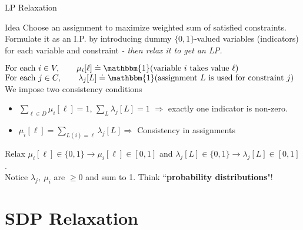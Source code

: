 \documentclass[10pt,t,compress]{beamer}
\begin{document}
\begin{frame}{LP Relaxation}
\begin{block}{Idea}
Choose an assignment to maximize weighted sum of satisfied constraints. \pause Formulate it as an I.P. by introducing dummy $\{ 0, 1\}$-valued variables (indicators) for each variable and constraint \pause \emph{- then relax it to get an LP.}
\end{block} \pause
$\text{For each } i \in V, \qquad  \mu_i[\ell] \doteq \mathbbm{1}( \text{variable $i$ takes value } \ell)$ \\
\vspace{0.25cm}
\pause
$\text{For each } j \in C, \qquad
   \lambda_j[L] \doteq \mathbbm{1}( \text{assignment $L$ is used for constraint $j$})$ \\
\vspace{0.25cm}
\pause
We impose two consistency conditions 
 \begin{itemize}
 \item $\displaystyle\sum_{\ell \in D} \mu_i[\ell] = 1$, $\displaystyle\sum_{L} \lambda_j[L] = 1$ $\Rightarrow$ exactly one indicator is non-zero.
 \pause
 \item $\mu_i[\ell] = \displaystyle\sum_{L(i) = \ell} \lambda_j[L] \Rightarrow$ Consistency in assignments
 \end{itemize}
\pause Relax $\mu_i[\ell] \in \{ 0, 1\} \rightarrow \mu_i[\ell] \in [0, 1]$ and $\lambda_j[L] \in \{ 0, 1\} \rightarrow \lambda_j[L] \in [0, 1]$. \\ \vspace{0.25cm}
\pause Notice $\lambda_j, ~\mu_i$ are $\geq 0$ and sum to 1. Think ``\textbf{probability distributions}"!
\end{frame}

\section{SDP Relaxation}
\end{document}
